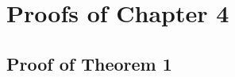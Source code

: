 \chapter{Proofs of Chapter 4}\label{appendix:A}

\section{Proof of Theorem 1}
\label{appendix:A:sec:1}
